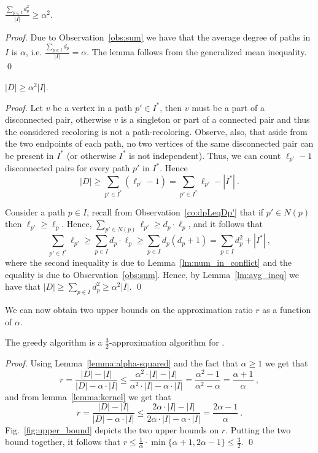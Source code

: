\begin{lemma}
\label{lm:avg_ineq}
$\frac{\sum_{p \in I}{d_p^2}}{|I|} \geq \alpha^2$.
\end{lemma}
\begin{proof}
Due to Observation~\ref{obs:sum} we have that the average degree of
paths in $I$ is $\alpha$, i.e. $\frac{\sum_{p \in I}{d_p}}{|I|}
= \alpha$.  The lemma follows from the generalized mean inequality.
\qed{}\end{proof}


\begin{lemma}
\label{lemma:alpha-squared}
$|D| \geq \alpha^2|I|$.
\end{lemma}
\begin{proof}
Let $v$ be a vertex in a path $p' \in I^*$, then $v$ must be a part of
a disconnected pair, otherwise $v$ is a singleton or part of a
connected pair and thus the considered recoloring is not a
path-recoloring.  Observe, also, that aside from the two endpoints of
each path, no two vertices of the same disconnected pair can be
present in $I^*$ (or otherwise $I^*$ is not independent).  Thus, we
can count $\ell_{p'} - 1$ disconnected pairs for every path $p'$ in
$I^*$.  Hence
\[
|D| \geq \sum_{p' \in I^*} (\ell_{p'} - 1) = \sum_{p' \in I^*}{\ell_{p'}} -
|I^*| ~.
\]

Consider a path $p \in I$, 
recall from Observation~\ref{co:dpLeqDp'} that if $p' \in N(p)$ 
then $\ell_{p'} \geq \ell_p$.
%
Hence, 
$\sum_{p' \in N(p)}{\ell_{p'}} \geq d_p \cdot \ell_p$, 
and it follows that
\[
\sum_{p' \in I^*} \ell_{p'}
\geq \sum_{p \in I} d_p \cdot \ell_p
\geq \sum_{p \in I} d_p(d_p+1)
=    \sum_{p \in I} d_p^2 + |I^*|
~,
\]
where the second inequality is due to Lemma~\ref{lm:num_in_conflict}
and the equality is due to Observation~\ref{obs:sum}.
Hence, by Lemma~\ref{lm:avg_ineq} we have that
\(
|D| \geq \sum_{p \in I} d_p^2 \geq \alpha^2 |I|
\).
\qed{}\end{proof}

We can now obtain two upper bounds on the approximation ratio $r$ as a
function of $\alpha$.

\begin{theorem}
The greedy algorithm is a $\frac{3}{2}$-approximation algorithm for
\TWOCR{}.
\end{theorem}
\begin{proof}
Using Lemma~\ref{lemma:alpha-squared} and the fact that $\alpha \geq 1$ we get
that
$$
r
=    \frac{|D| - |I|}{|D| - \alpha \cdot |I|}
\leq \frac{\alpha ^ 2 \cdot |I| - |I|}{\alpha ^ 2 \cdot |I| - \alpha \cdot |I|}
=    \frac{\alpha ^ 2 - 1}{\alpha ^ 2 - \alpha}
=    \frac{\alpha+1}{\alpha}
~, 
$$
and from lemma~\ref{lemma:kernel} we get that
$$
r
=    \frac{|D| - |I|}{|D| - \alpha \cdot |I|}
\leq \frac{2 \alpha \cdot |I| - |I|}{2 \alpha \cdot |I| - \alpha \cdot |I|}
=    \frac{2 \alpha - 1}{\alpha}
~.
$$
Fig.~\ref{fig:upper_bound} depicts the two upper bounds on $r$.
Putting the two bound together, it follows that
\(
r
\leq \frac{1}{\alpha} \cdot \min\{\alpha+1,2\alpha-1\}
\leq    \frac{3}{2}
\).
\qed{}\end{proof}



